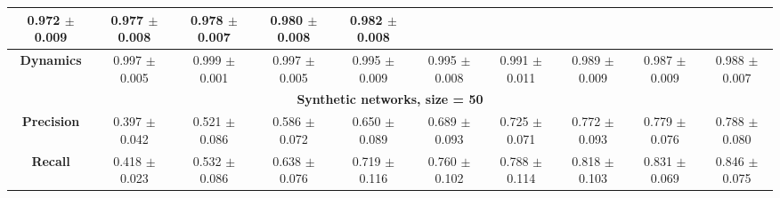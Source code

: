 \begin{table}[h!]
\begin{tabular}{|c|ccccccccc|}
\makecell{0.972 \\ $\pm$0.009} & \makecell{0.977 \\ $\pm$0.008} & \makecell{0.978 \\ $\pm$0.007} & \makecell{0.980 \\ $\pm$0.008} & \makecell{0.982 \\ $\pm$0.008} \\
\hline
\textbf{Dynamics} & 
\makecell{0.997 \\ $\pm$0.005} & \makecell{0.999 \\ $\pm$0.001} & \makecell{0.997 \\ $\pm$0.005} & \makecell{0.995 \\ $\pm$0.009} & 
\makecell{0.995 \\ $\pm$0.008} & \makecell{0.991 \\ $\pm$0.011} & \makecell{0.989 \\ $\pm$0.009} & \makecell{0.987 \\ $\pm$0.009} & \makecell{0.988 \\ $\pm$0.007} \\
\hline
\multicolumn{10}{|c|}{\textbf{Synthetic networks, size = 50}} \\
\hline
\textbf{Precision} & \makecell{0.397\\$\pm$0.042} & \makecell{0.521\\$\pm$0.086} & \makecell{0.586\\$\pm$0.072} & \makecell{0.650\\$\pm$0.089} & \makecell{0.689\\$\pm$0.093} & \makecell{0.725\\$\pm$0.071} & \makecell{0.772\\$\pm$0.093} & \makecell{0.779\\$\pm$0.076} & \makecell{0.788\\$\pm$0.080} \\
\textbf{Recall} & \makecell{0.418\\$\pm$0.023} & \makecell{0.532\\$\pm$0.086} & \makecell{0.638\\$\pm$0.076} & \makecell{0.719\\$\pm$0.116} & \makecell{0.760\\$\pm$0.102} & \makecell{0.788\\$\pm$0.114} & \makecell{0.818\\$\pm$0.103} & \makecell{0.831\\$\pm$0.069} & \makecell{0.846\\$\pm$0.075} \\

\end{tabular}
\end{table}
